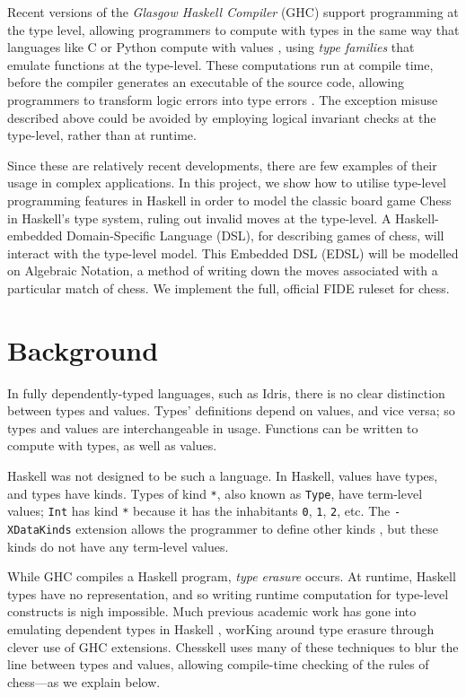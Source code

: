\documentclass[12pt, a4paper, bibliography=totocnumbered]{scrartcl}
\begin{document}
Recent versions of the \emph{Glasgow Haskell Compiler} (GHC) support programming at the type level, allowing programmers to compute with types in the same way that languages like C or Python compute with values \cite{yorgey2012giving}, using \emph{type families} \cite{opentfs} \cite{closedtfs} that emulate functions at the type-level. These computations run at compile time, before the compiler generates an executable of the source code, allowing programmers to transform logic errors into type errors \cite{twt}. The exception misuse described above could be avoided by employing logical invariant checks at the type-level, rather than at runtime.

Since these are relatively recent developments, there are few examples of their usage in complex applications. In this project, we show how to utilise type-level programming features in Haskell in order to model the classic board game Chess in Haskell's type system, ruling out invalid moves at the type-level. A Haskell-embedded Domain-Specific Language (DSL), for describing games of chess, will interact with the type-level model. This Embedded DSL (EDSL) will be modelled on Algebraic Notation, a method of writing down the moves associated with a particular match of chess. We implement the full, official FIDE ruleset for chess.

\section{Background}

In fully dependently-typed languages, such as Idris, there is no clear distinction between types and values. Types' definitions depend on values, and vice versa; so types and values are interchangeable in usage. Functions can be written to compute with types, as well as values.

Haskell was not designed to be such a language. In Haskell, values have types, and types have kinds. Types of kind \lstinline[basicstyle=\ttfamily]{*}, also known as \lstinline[basicstyle=\ttfamily]{Type}, have term-level values; \lstinline[basicstyle=\ttfamily]{Int} has kind \lstinline[basicstyle=\ttfamily]{*} because it has the inhabitants \lstinline[basicstyle=\ttfamily]{0}, \lstinline[basicstyle=\ttfamily]{1}, \lstinline[basicstyle=\ttfamily]{2}, etc. The \lstinline[basicstyle=\ttfamily]{-XDataKinds} extension allows the programmer to define other kinds \cite{yorgey2012giving}, but these kinds do not have any term-level values.

While GHC compiles a Haskell program, \emph{type erasure} occurs. At runtime, Haskell types have no representation, and so writing runtime computation for type-level constructs is nigh impossible. Much previous academic work has gone into emulating dependent types in Haskell \cite{singletons}, worKing around type erasure through clever use of GHC extensions. Chesskell uses many of these techniques to blur the line between types and values, allowing compile-time checking of the rules of chess---as we explain below.
\end{document}
